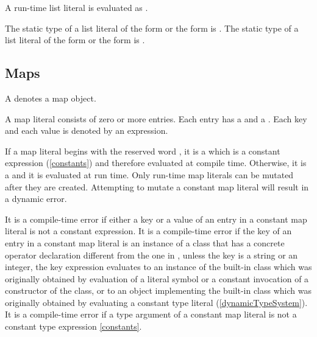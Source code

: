 \documentclass[makeidx]{article}
\begin{document}
\LMHash{}%
A run-time list literal
\code{[$e_1, \ldots, e_n$]}
is evaluated as
\code{<\DYNAMIC{}>[$e_1, \ldots, e_n$]}.


\LMHash{}%
The static type of a list literal of the form
or the form
is .
The static type of a list literal of the form
\code{\CONST{} [$e_1, \ldots, e_n$]}
or the form
\code{[$e_1, \ldots, e_n$]}
is .


\subsection{Maps}

\LMHash{}%
A  denotes a map object.

\begin{grammar}
<mapLiteral> ::= \CONST{}? <typeArguments>?
  \gnewline{} `{' (<mapLiteralEntry> (`,' <mapLiteralEntry>)* `,'?)? `\}'

<mapLiteralEntry> ::= <expression> `:' <expression>
\end{grammar}

\LMHash{}%
A map literal consists of zero or more entries.
Each entry has a  and a .
Each key and each value is denoted by an expression.

\LMHash{}%
If a map literal begins with the reserved word \CONST{}, it is a
which is a constant expression (\ref{constants}) and therefore evaluated at compile time.
Otherwise, it is a
and it is evaluated at run time.
Only run-time map literals can be mutated after they are created.
Attempting to mutate a constant map literal will result in a dynamic error.

\LMHash{}%
It is a compile-time error if either a key or a value of an entry in a constant map literal is not a constant expression.
It is a compile-time error if the key of an entry in a constant map literal is an instance of
a class that has a concrete operator  declaration different from the one in ,
unless the key is a string or an integer,
the key expression evaluates to an instance of the built-in
class  which was originally obtained by evaluation of a
literal symbol or
a constant invocation of a constructor of the  class,
or to an object implementing the built-in class 
which was originally obtained by evaluating a constant type literal
(\ref{dynamicTypeSystem}).
It is a compile-time error if a type argument of a constant map literal
is not a constant type expression \ref{constants}.
\end{document}
